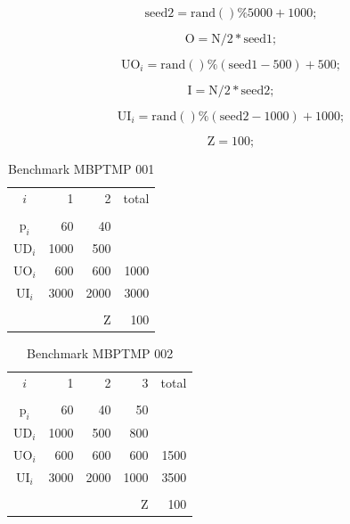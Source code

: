 \documentclass[authoryear,preprint,12pt]{elsarticle}
\begin{document}
\begin{equation}
\textrm{seed2} = \textrm{rand}()\%5000 + 1000;
\end{equation}

\begin{equation}
\textrm{O} = \textrm{N}/2*\textrm{seed1};
\end{equation}

\begin{equation}
\textrm{UO}_i = \textrm{rand}()\%(\textrm{seed1}-500) + 500;
\end{equation}

\begin{equation}
\textrm{I} = \textrm{N}/2*\textrm{seed2};
\end{equation}

\begin{equation}
\textrm{UI}_i = \textrm{rand}()\%(\textrm{seed2}-1000) + 1000;
\end{equation}

\begin{equation}
\textrm{Z} = 100;
\end{equation}


\begin{table}[h]
\begin{center}
\begin{tabular}[c]{c r r r}
$i$ & 1 & 2 & total \\
\cline {1-4} \\
$\textrm{p}_i$ & 60 & 40 & \\
$\textrm{UD}_i$ & 1000 & 500 & \\
$\textrm{UO}_i$ & 600 & 600 & 1000 \\
$\textrm{UI}_i$ & 3000 & 2000 & 3000 \\
\cline {1-4} \\
& & $\textrm{Z}$ & 100 \\
\end{tabular}
\caption{Benchmark MBPTMP 001}
\label{tab:MBPTMP001}
\end{center}
\end{table}

\begin{table}[h]
\begin{center}
\begin{tabular}[c]{c r r r r}
$i$ & 1 & 2 & 3 & total \\
\cline {1-5} \\
$\textrm{p}_i$ & 60 & 40 & 50 \\
$\textrm{UD}_i$ & 1000 & 500 & 800 \\
$\textrm{UO}_i$ & 600 & 600 & 600 & 1500 \\
$\textrm{UI}_i$ & 3000 & 2000 & 1000 & 3500 \\
\cline {1-5} \\
& & & $\textrm{Z}$ & 100 \\
\end{tabular}
\caption{Benchmark MBPTMP 002}
\label{tab:MBPTMP002}
\end{center}
\end{table}
\end{document}
